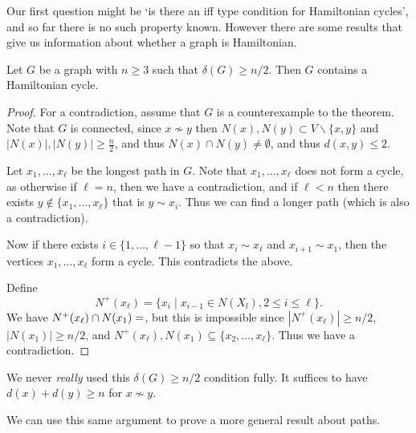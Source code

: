 \documentclass[a4paper]{scrreprt}
\begin{document}
\begin{center}

\end{center}


Our first question might be `is there an iff type condition for Hamiltonian cycles', and so far there is no such property known. However there are some results that give us information about whether a graph is Hamiltonian.

\begin{theorem}
	Let $G$ be a graph with $n\geq 3$ such that $\delta(G) \geq n/2$. Then $G$ contains a Hamiltonian cycle.
\end{theorem}
\begin{proof}
	For a contradiction, assume that $G$ is a counterexample to the theorem.
	Note that $G$ is connected, since $x \not \sim y$ then $N(x), N(y) \subset V \backslash\{x, y\}$ and $|N(x)|, |N(y)| \geq \frac{n}{2}$, and thus $N(x) \cap N(y) \neq \emptyset$, and thus $d(x, y) \leq 2$.

	Let $x_1, \dots, x_\ell$ be the longest path in $G$. Note that $x_1, \dots, x_\ell$ does not form a cycle, as otherwise if $\ell = n$, then we have a contradiction, and if $\ell < n$ then there exists $y \not \in \{x_1, \dots, x_\ell\}$ that is $y \sim x_i$. Thus we can find a longer path (which is also a contradiction).

	Now if there exists $i \in \{1, \dots, \ell - 1\}$ so that $x_i \sim x_\ell$ and $x_{i + 1} \sim x_1$, then the vertices $x_1, \dots, x_\ell$ form a cycle. This contradicts the above.

	Define
	$$
	N^+(x_\ell) = \{x_i \mid x_{i - 1} \in N(X_l), 2 \leq i \leq \ell\}.
	$$
	We have $N^+(x_\ell) \cap N(x_1) = \empty$, but this is impossible since $|N^+(x_\ell)| \geq n/2$, $|N(x_1)| \geq n/2$, and $N^+(x_\ell), N(x_1) \subseteq \{x_2, \dots, x_\ell\}$. Thus we have a contradiction.
\end{proof}

\begin{remark}
	We never \emph{really} used this $\delta(G) \geq n/2$ condition fully. It suffices to have $d(x) + d(y) \geq n$ for $x \not \sim y$.
\end{remark}

We can use this same argument to prove a more general result about paths.
\end{document}
